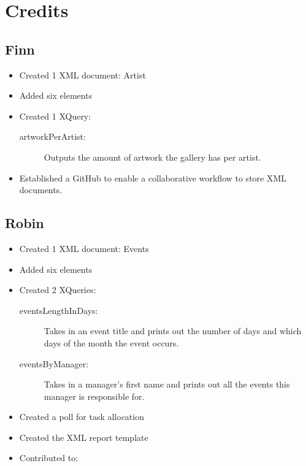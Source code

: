 \documentclass{article} %
\begin{document}
\newpage
\section{Credits}

\subsection{Finn}
\begin{itemize}
    \item Created 1 XML document: Artist
    \item Added six elements
    \item Created 1 XQuery:
    \begin{description}
        \item [artworkPerArtist:] Outputs the amount of artwork the gallery has per artist.
    \end{description}
    \item Established a GitHub to enable a collaborative workflow to store XML documents.
\end{itemize}

\subsection{Robin}
\begin{itemize}
    \item Created 1 XML document: Events
    \item Added six elements 
    \item Created 2 XQueries:
    \begin{description}
        \item[eventsLengthInDays:] Takes in an event title and prints out the number of days and which days of the month the event occurs.
        \item[eventsByManager:] Takes in a manager's first name and prints out all the events this manager is responsible for.
    \end{description}
    \item Created a poll for task allocation
    \item Created the XML report template
    \item Contributed to:
\end{itemize}
\end{document}
